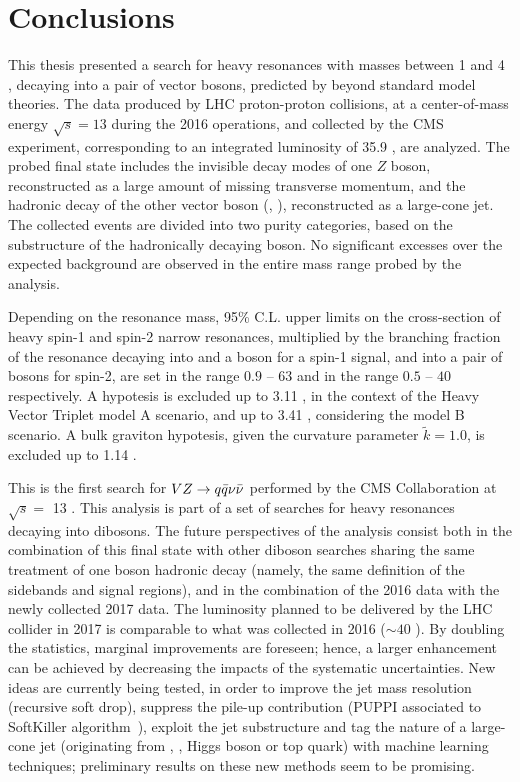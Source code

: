 \chapter{Conclusions}
\label{ch:conclusion}

This thesis presented a search for heavy resonances with masses between 1 \TeV and 4 \TeV, decaying into a pair of vector bosons, predicted by beyond standard model theories. The data produced by LHC proton-proton collisions, at a center-of-mass energy $\sqrt{s}=13$ \TeV during the 2016 operations, and collected by the CMS experiment, corresponding to an integrated luminosity of 35.9 \fbinv, are analyzed. The probed final state includes the invisible decay modes of one $Z$ boson, reconstructed as a large amount of missing transverse momentum, and the hadronic decay of the other vector boson (\Z, \W), reconstructed as a large-cone jet. The collected events are divided into two purity categories, based on the substructure of the hadronically decaying \V boson. No significant excesses over the expected background are observed in the entire mass range probed by the analysis.

\noindent Depending on the resonance mass, 95\% C.L. upper limits on the cross-section of heavy spin-1 and spin-2 narrow resonances, multiplied by the branching fraction of the resonance decaying into \Z and a \W boson for a spin-1 signal, and into a pair of \Z bosons for spin-2, are set in the range $0.9$ -- $63$ \fb and in the range $0.5$ -- $40$ \fb respectively. A \Wp hypotesis is excluded up to 3.11 \TeV, in the context of the Heavy Vector Triplet model A scenario, and up to 3.41 \TeV, considering the model B scenario. A bulk graviton hypotesis, given the curvature parameter $\tilde{k}=1.0$, is excluded up to 1.14 \TeV.

\vspace*{1\baselineskip}

\noindent This is the first search for $VZ \rightarrow q \bar{q} \nu \bar{\nu}$ performed by the CMS Collaboration at $\sqrt{s} = $ 13 \TeV. This analysis is part of a set of searches for heavy resonances decaying into dibosons. The future perspectives of the analysis consist both in the combination of this final state with other diboson searches sharing the same treatment of one boson hadronic decay (namely, the same definition of the sidebands and signal regions), and in the combination of the 2016 data with the newly collected 2017 data. The luminosity planned to be delivered by the LHC collider in 2017 is comparable to what was collected in 2016 ($\sim 40$ \fbinv). By doubling the statistics, marginal improvements are foreseen; hence, a larger enhancement can be achieved by decreasing the impacts of the systematic uncertainties. New ideas are currently being tested, in order to improve the jet mass resolution (recursive soft drop), suppress the pile-up contribution (PUPPI associated to SoftKiller algorithm~\cite{Cacciari:2014gra}), exploit the jet substructure and tag the nature of a large-cone jet (originating from \W, \Z, Higgs boson or top quark) with machine learning techniques; preliminary results on these new methods seem to be promising.

\clearpage

